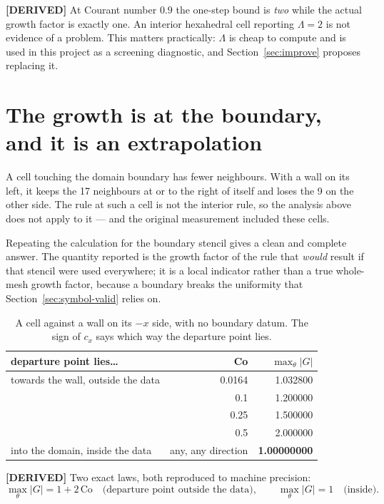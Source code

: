 \documentclass[11pt,a4paper]{article}
\newcommand{\derived}{\textcolor{blue!50!black}{\textbf{[DERIVED]}}}
\begin{document}
\derived{} At Courant number $0.9$ the one-step bound is \emph{two} while the actual growth
factor is exactly one. An interior hexahedral cell reporting $\Lambda = 2$ is not evidence of
a problem. This matters practically: $\Lambda$ is cheap to compute and is used in this
project as a screening diagnostic, and Section~\ref{sec:improve} proposes replacing it.

\section{The growth is at the boundary, and it is an extrapolation}
\label{sec:boundary}

A cell touching the domain boundary has fewer neighbours. With a wall on its left, it keeps
the 17 neighbours at or to the right of itself and loses the 9 on the other side. The rule at
such a cell is not the interior rule, so the analysis above does not apply to it --- and the
original measurement included these cells.

Repeating the calculation for the boundary stencil gives a clean and complete answer. The
quantity reported is the growth factor of the rule that \emph{would} result if that stencil
were used everywhere; it is a local indicator rather than a true whole-mesh growth factor,
because a boundary breaks the uniformity that Section~\ref{sec:symbol-valid} relies on.

\begin{table}[h]
\centering
\caption{A cell against a wall on its $-x$ side, with no boundary datum. The sign of $c_x$
says which way the departure point lies.}
\label{tab:bracket}
\begin{tabular}{lrr}
\toprule
departure point lies\ldots & Co & $\max_\theta|G|$ \\
\midrule
towards the wall, outside the data & 0.0164 & 1.032800 \\
                                   & 0.1    & 1.200000 \\
                                   & 0.25   & 1.500000 \\
                                   & 0.5    & 2.000000 \\
\midrule
into the domain, inside the data   & any, any direction & \textbf{1.00000000} \\
\bottomrule
\end{tabular}
\end{table}

\derived{} Two exact laws, both reproduced to machine precision:
\begin{equation}
  \max_\theta |G| = 1 + 2\,\mathrm{Co}
  \quad\text{(departure point outside the data)},
  \qquad
  \max_\theta |G| = 1
  \quad\text{(inside)}.
  \label{eq:bndlaw}
\end{equation}
\end{document}
